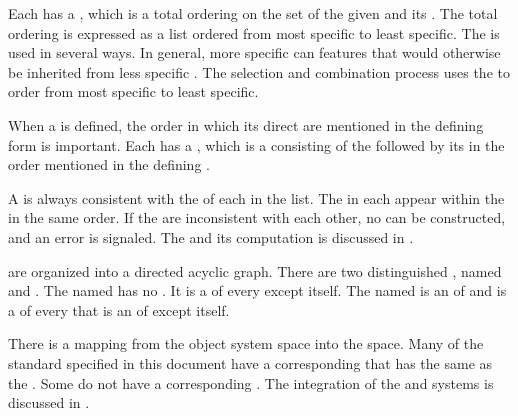 Each  has a ,
which is a total ordering on the set of the given  and its .
The total ordering is expressed as a list ordered from most specific to least specific.
The  is used in several ways.  In general, more
specific  can  features that would
otherwise be inherited from less specific .
The  selection and combination process uses 
the  to order  
from most specific to least specific. 
 
When a  is defined, the order in which its direct 
are mentioned in the defining form is important.  Each  has a
, which is a  consisting of the
 followed by its  in the order mentioned
in the defining .

A  is always consistent with the
 of each  in the list.  
The  in each  appear
within the  in the same order.  
If the  are inconsistent with each other, 
no  can be constructed, and an error is signaled.
The  and its computation is discussed
in \secref\DeterminingtheCPL.

 are organized into a directed acyclic graph.
There are two distinguished , named  and .
The  named  has no . 
It is a  of every  except itself.  
The  named  is an  of 
 and is a  of
every  that is an  of  except itself.

There is a mapping from the object system  space into
the  space.  Many of the standard  specified 
in this document have a corresponding  that has the same 
 as the . Some  do not have a
corresponding . The integration of the  and 
systems is discussed in \secref\IntegratingTypesAndClasses.

